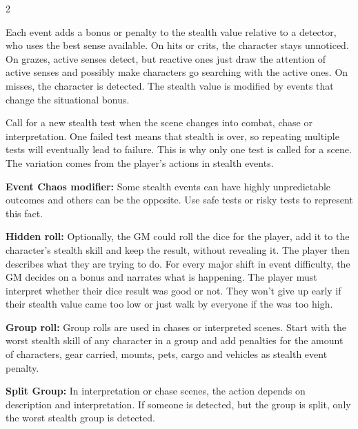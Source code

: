 \begin{multicols}{2}
{Each event adds a bonus or penalty to the stealth value relative to a detector, who uses the best sense available. On hits or crits, the character stays unnoticed. On grazes, active senses detect, but reactive ones just draw the attention of active senses and possibly make characters go searching with the active ones. On misses, the character is detected. The stealth value is modified by events that change the situational bonus.

Call for a new stealth test when the scene changes into combat, chase or interpretation. One failed test means that stealth is over, so repeating multiple tests will eventually lead to failure. This is why only one test is called for a scene. The variation comes from the player's actions in stealth events.

\textbf{Event Chaos modifier:} Some stealth events can have highly unpredictable outcomes and others can be the opposite. Use safe tests or risky tests to represent this fact.

\textbf{Hidden roll:} Optionally, the GM could roll the dice for the player, add it to the character's stealth skill and keep the result, without revealing it. The player then describes what they are trying to do. For every major shift in event difficulty, the GM decides on a bonus and narrates what is happening. The player must interpret whether their dice result was good or not. They won't give up early if their stealth value came too low or just walk by everyone if the was too high.

\textbf{Group roll:} Group rolls are used in chases or interpreted scenes. Start with the worst stealth skill of any character in a group and add penalties for the amount of characters, gear carried, mounts, pets, cargo and vehicles as stealth event penalty.  

\textbf{Split Group:} In interpretation or chase scenes, the action depends on description and interpretation. If someone is detected, but the group is split, only the worst stealth group is detected.
}

\end{multicols}
